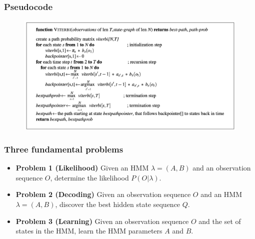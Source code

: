 \documentclass{beamer}
\begin{document}
\begin{frame}
    \frametitle{Pseudocode}
    \begin{figure}[H]
        \centering
        \includegraphics[width=\textwidth]{img/3.png}
        \end{figure}
\end{frame}
\begin{frame}
    \frametitle{Three fundamental problems \cite{rabiner1989tutorial}}
    \begin{itemize}
        \item {\color{gray}\textbf{Problem 1 (Likelihood)} Given an HMM $λ = (A, B)$ and an observation sequence $O$, determine the likelihood $P(O |\lambda)$.}
        \item \textbf{Problem 2 (Decoding)} Given an observation sequence $O$ and an HMM $λ = (A, B)$, discover the best hidden state sequence $Q$.
        \item {\color{gray}\textbf{Problem 3 (Learning)} Given an observation sequence $O$ and the set of states in the HMM, learn the HMM parameters $A$ and $B$.}
    \end{itemize}

\end{frame}
\end{document}
